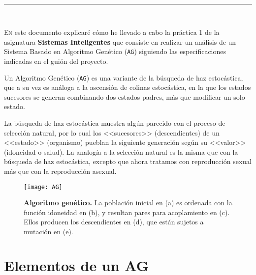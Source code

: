 
\begin{center}
	{\fboxrule=4pt } \\
	\setcounter{chapter}{1}
	\setcounter{section}{0}
	\rule{15cm}{0pt} \\
\end{center}

 
 \lettrine[lines=3, depth = 0]{E}{n} este documento explicar\'e c\'omo he llevado a cabo la práctica 1 de la asignatura \textbf{Sistemas Inteligentes} que consiste 
 en realizar un análisis de un Sistema Basado en Algoritmo Genético (\texttt{AG}) siguiendo las especificaciones indicadas en el gui\'on del proyecto.
 \par Un Algoritmo Genético (\texttt{AG}) es una variante de la búsqueda de haz estocástica, que a su vez es análoga a la ascensión de colinas estocástica, en la que los estados sucesores se generan combinando dos estados padres, 
 más que modificar un solo estado. 
 \par La búsqueda de haz estocástica muestra algún parecido con el proceso de selección natural, 
 por lo cual los <<sucesores>> (descendientes) de un <<estado>> (organismo) pueblan la siguiente generación según su <<valor>> (idoneidad o salud).
 La analogía a la selección natural es la misma que con la búsqueda de haz estocástica, excepto que ahora tratamos 
 con reproducción sexual más que con la reproducción asexual.

\begin{figure}[H]
	\texttt{[image: AG]}
	\centering
	\caption{\textbf{Algoritmo genético.} La población inicial en (a) es ordenada con la función idoneidad en (b), y resultan pares para acoplamiento en (c). 
	Ellos producen los descendientes en (d), que están sujetos a mutación en (e).}
    	\label{fig:AG}
\end{figure}
 
\section{Elementos de un AG}
